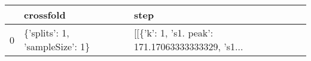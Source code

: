 \begin{tabular}{lll}
\toprule
{} &                       crossfold &                                               step \\
\midrule
0 &  \{'splits': 1, 'sampleSize': 1\} &  [[\{'k': 1, 's1. peak': 171.17063333333329, 's1... \\
\bottomrule
\end{tabular}
